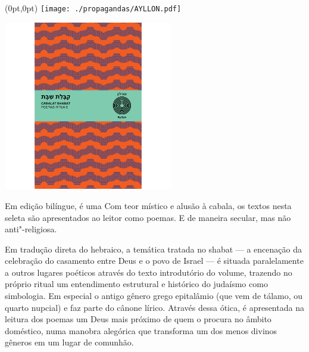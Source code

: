 \pagestyle{ayllon}
\label{ayllon}


\begin{textblock*}{5.625in}(0pt,0pt)%
\vspace*{-3.49cm}
\hspace*{-2.76cm}\texttt{[image: ./propagandas/AYLLON.pdf]}
\end{textblock*}

\pagebreak %

\begin{center}
\hspace*{-3.6cm}
\hspace*{3.1cm}\includegraphics[width=74mm]{./grid/cabalat.png}
\end{center}

\hspace*{-7cm}\hrulefill\hspace*{-7cm}

\medskip

\noindent{}Em edição bilíngue, {} é uma  Com teor místico e alusão à cabala, os textos nesta seleta são apresentados ao leitor como poemas. E de maneira secular, mas não anti"-religiosa.

Em tradução direta do hebraico, a temática tratada no shabat --- a encenação da celebração do casamento entre Deus e o povo de Israel --- é situada paralelamente a outros lugares poéticos através do texto introdutório do volume, trazendo no próprio ritual um entendimento estrutural e histórico do judaísmo como simbologia. Em especial o antigo gênero grego epitalâmio (que vem de tálamo, ou quarto nupcial) e faz parte do cânone lírico. Através dessa ótica, é apresentada na leitura dos poemas um Deus mais próximo de quem o procura no âmbito doméstico, numa manobra alegórica que transforma um dos menos divinos gêneros em um lugar de comunhão.


